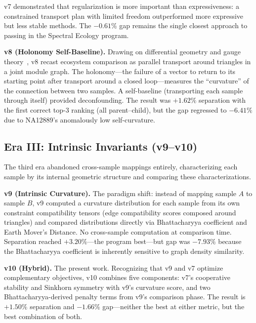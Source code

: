 \documentclass{../yalumba}
\begin{document}
\begin{keyfinding}
v7 demonstrated that regularization is more important than expressiveness:
a constrained transport plan with limited freedom outperformed more
expressive but less stable methods.  The $-0.61\%$ gap remains the
single closest approach to passing in the Spectral Ecology program.
\end{keyfinding}

\textbf{v8 (Holonomy Self-Baseline).}  Drawing on differential geometry
and gauge theory~\cite{nakahara2003geometry}, v8 recast ecosystem
comparison as parallel transport around triangles in a joint module
graph.  The holonomy---the failure of a vector to return to its starting
point after transport around a closed loop---measures the ``curvature''
of the connection between two samples.  A self-baseline (transporting
each sample through itself) provided deconfounding.  The result was
$+1.62\%$ separation with the first correct top-3 ranking (all
parent--child), but the gap regressed to $-6.41\%$ due to NA12889's
anomalously low self-curvature.

\subsection{Era III: Intrinsic Invariants (v9--v10)}

The third era abandoned cross-sample mappings entirely, characterizing
each sample by its internal geometric structure and comparing these
characterizations.

\textbf{v9 (Intrinsic Curvature).}  The paradigm shift: instead of
mapping sample $A$ to sample $B$, v9 computed a curvature distribution
for each sample from its own constraint compatibility tensors (edge
compatibility scores composed around triangles) and compared distributions
directly via Bhattacharyya coefficient and Earth Mover's Distance.
No cross-sample computation at comparison time.  Separation reached
$+3.20\%$---the program best---but gap was $-7.93\%$ because the
Bhattacharyya coefficient is inherently sensitive to graph density
similarity.

\textbf{v10 (Hybrid).}  The present work.  Recognizing that v9 and v7
optimize complementary objectives, v10 combines five components: v7's
cooperative stability and Sinkhorn symmetry with v9's curvature score,
and two Bhattacharyya-derived penalty terms from v9's comparison phase.
The result is $+1.50\%$ separation and $-1.66\%$ gap---neither the best
at either metric, but the best combination of both.
\end{document}

